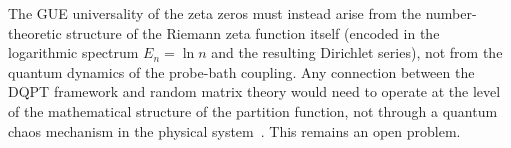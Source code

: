The GUE universality of the zeta zeros must instead arise from the number-theoretic
structure of the Riemann zeta function itself (encoded in the logarithmic spectrum
$E_n = \ln n$ and the resulting Dirichlet series), not from the quantum dynamics of the
probe-bath coupling. Any connection between the DQPT framework and random matrix theory
would need to operate at the level of the mathematical structure of the partition
function, not through a quantum chaos mechanism in the physical
system~\cite{berrykeating1999}. This remains an open problem.

